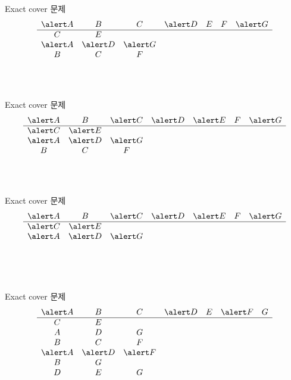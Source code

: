 \documentclass{beamer}
\begin{document}
%
\begin{frame}{Exact cover 문제} 
  $$
  \begin{array}{ccccccc}
    \alert A & B & C & \alert D & E & F & \alert G\\
    \hline
    C & E &&&&&\\
    \alert A & \alert D & \alert G &&&&\\
    B & C & F &&&&\\
    &&&&&&\\
    &&&&&&\\
    &&&&&&
  \end{array}
  $$
\end{frame}

%
\begin{frame}{Exact cover 문제} 
  $$
  \begin{array}{ccccccc}
    \alert A & B & \alert C & \alert D & \alert E & F & \alert G\\
    \hline
    \alert C & \alert E &&&&&\\
    \alert A & \alert D & \alert G &&&&\\
    B & C & F &&&&\\
    &&&&&&\\
    &&&&&&\\
    &&&&&&
  \end{array}
  $$
\end{frame}

%
\begin{frame}{Exact cover 문제} 
  $$
  \begin{array}{ccccccc}
    \alert A & B & \alert C & \alert D & \alert E & F & \alert G\\
    \hline
    \alert C & \alert E &&&&&\\
    \alert A & \alert D & \alert G &&&&\\
    &&&&&&\\
    &&&&&&\\
    &&&&&&\\
    &&&&&&
  \end{array}
  $$
\end{frame}

%
\begin{frame}{Exact cover 문제} 
  $$
  \begin{array}{ccccccc}
    \alert A & B & C & \alert D & E & \alert F & G\\
    \hline
    C & E &&&&&\\
    A & D & G &&&&\\
    B & C & F &&&&\\
    \alert A & \alert D & \alert F &&&&\\
    B & G &&&&&\\
    D & E & G &&&&
  \end{array}
  $$
\end{frame}
\end{document}
